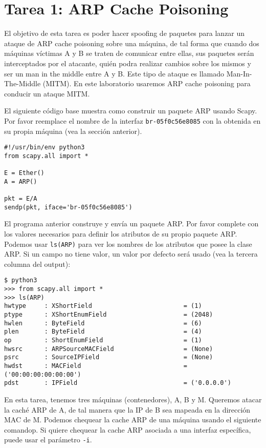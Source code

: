\section{Tarea 1: ARP Cache Poisoning}

El objetivo de esta tarea es poder hacer spoofing de paquetes para lanzar un ataque de ARP cache poisoning sobre una máquina, de tal forma que cuando dos máquinas víctimas A y B se traten de comunicar entre ellas, sus paquetes serán interceptados por el atacante, quién podra realizar cambios sobre los mismos y ser un man in the middle entre A y B. Este tipo de ataque es llamado Man-In-The-Middle (MITM).
En este laboratorio usaremos ARP cache poisoning para conducir un ataque MITM.

El siguiente código base muestra como construir un paquete ARP usando Scapy.
Por favor reemplace el nombre de la interfaz \texttt{br-05f0c56e8085} con la obtenida en su propia máquina (vea la sección anterior).

\begin{lstlisting}
#!/usr/bin/env python3
from scapy.all import *

E = Ether()
A = ARP()

pkt = E/A
sendp(pkt, iface='br-05f0c56e8085')
\end{lstlisting}

El programa anterior construye y envía un paquete ARP. Por favor complete con los valores necesarios para definir los atributos de su propio paquete ARP. Podemos usar \texttt{ls(ARP)} para ver los nombres de los atributos que posee la clase ARP. Si un campo no tiene valor, un valor por defecto será usado (vea la tercera columna del output):


\begin{lstlisting}
$ python3
>>> from scapy.all import *
>>> ls(ARP)
hwtype     : XShortField                         = (1)
ptype      : XShortEnumField                     = (2048)
hwlen      : ByteField                           = (6)
plen       : ByteField                           = (4)
op         : ShortEnumField                      = (1)
hwsrc      : ARPSourceMACField                   = (None)
psrc       : SourceIPField                       = (None)
hwdst      : MACField                            = ('00:00:00:00:00:00')
pdst       : IPField                             = ('0.0.0.0')
\end{lstlisting}

En esta tarea, tenemos tres máquinas (contenedores), A, B y M.
Queremos atacar la caché ARP de A, de tal manera que la IP de B sea mapeada en la dirección MAC de M. Podemos chequear la cache ARP de una máquina usando el siguiente comandop. Si quiere chequear la cache ARP asociada a una interfaz específica, puede usar el parámetro \texttt{-i}.

